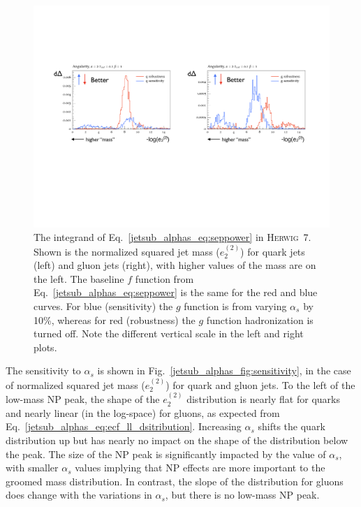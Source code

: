 \documentclass[11pt]{cernrep}
\begin{document}
\begin{figure}[t]
\begin{center}
\includegraphics[width = 0.99\columnwidth]{jetsub_alphas_differentialseparation2.pdf}
\end{center}
\caption{The integrand of Eq.~\ref{jetsub_alphas_eq:seppower} in \textsc{Herwig~7}.  Shown is the normalized squared jet mass ($e_2^{(2)}$)  for quark jets (left) and gluon jets (right), with higher values of the mass are on the left.  The baseline $f$ function from Eq.~\ref{jetsub_alphas_eq:seppower} is the same for the red and blue curves.  For blue (sensitivity) the $g$ function is from varying $\alpha_s$ by 10\%, whereas for red (robustness) the $g$ function hadronization is turned off.  Note the different vertical scale in the left and right plots. }
\label{jetsub_alphas_fig:differentialseparation}
\end{figure}

The sensitivity to $\alpha_s$ is shown in Fig.~\ref{jetsub_alphas_fig:sensitivity}, in the case of normalized squared jet mass ($e_2^{(2)}$) for quark and gluon jets.
%
To the left of the low-mass NP peak, the shape of the $e_2^{(2)}$ distribution is nearly flat for quarks and nearly linear (in the log-space) for gluons, as expected from Eq.~\ref{jetsub_alphas_eq:ecf_ll_dsitribution}.
%
Increasing $\alpha_s$ shifts the quark distribution up but has nearly no impact on the shape of the distribution below the peak.
%
The size of the NP peak is significantly impacted by the value of $\alpha_s$, with smaller $\alpha_s$ values implying that NP effects are more important to the groomed mass distribution.
%
In contrast, the slope of the distribution for gluons does change with the variations in $\alpha_s$, but there is no low-mass NP peak.
\end{document}
